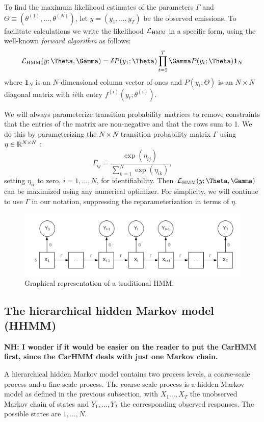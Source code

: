 To find the maximum likelihood estimates of the parameters $\Gamma$ and $\Theta \equiv (\theta^{(1)},\ldots,\theta^{(N)})$, let $y = (y_1,\ldots,y_T)$ be the observed emissions. 
 To facilitate calculations we write the likelihood $\mathcal{L}_{\text{HMM}}$ in a specific form, using the  well-known \textit{forward algorithm} \cite{Zucchini:2016} as follows:
%
$$\calL_{\text{HMM}}(y;\Theta,\Gamma) = \delta P(y_1;\Theta) \prod_{t=2}^T \Gamma P(y_t;\Theta) \mathbf{1}_N$$
%
where $\mathbf{1}_N$ is an $N$-dimensional column vector of ones and
%
$P(y_t;\Theta)$ is an $N \times N$ diagonal matrix with $ii$th entry  $f^{(i)}(y_t; \theta^{(i)})$.
%

We will always parameterize transition probability matrices to remove constraints that the entries of the matrix are non-negative and that  the rows sum to 1.  We do this by parameterizing the $N \times N$ transition probability matrix $\Gamma$ using $\eta \in \mathbb{R}^{N \times N}$ \cite{Barajas:2017}:
%
\[
\Gamma_{ij} = \frac{\exp(\eta_{ij})}{\sum_{k=1}^N \exp(\eta_{ik})}, 
\]
%
setting $\eta_{ii}$  to zero, $i=1,\ldots, N$, for identifiability.  Then $\calL_{\text{HMM}}(y;\Theta,\Gamma)$ can be maximized using any numerical optimizer.  For simplicity, we will continue to use $\Gamma$ in our notation, suppressing the reparameterization in terms of  $\eta$.

\begin{figure}[h!]
	\centering
	\includegraphics[width=5in]{../Plots/HMM.png}
	\caption{Graphical representation of a traditional HMM.}
	\label{fig:HMM}
\end{figure}

\subsection{The hierarchical hidden Markov model (HHMM)}

{\bf{NH:
I wonder if it would be easier on the reader to put the CarHMM first, since the CarHMM deals with just one Markov chain.
}}

A hierarchical hidden Markov model contains two process levels, a coarse-scale process and a fine-scale process.  The coarse-scale process is a hidden Markov model as defined in the previous subsection,  with  $X_1\ldots, X_T$ the unobserved Markov chain of states and $Y_1,\ldots, Y_T$ the corresponding observed responses.  The possible states are $1,\ldots, N$.   
%

